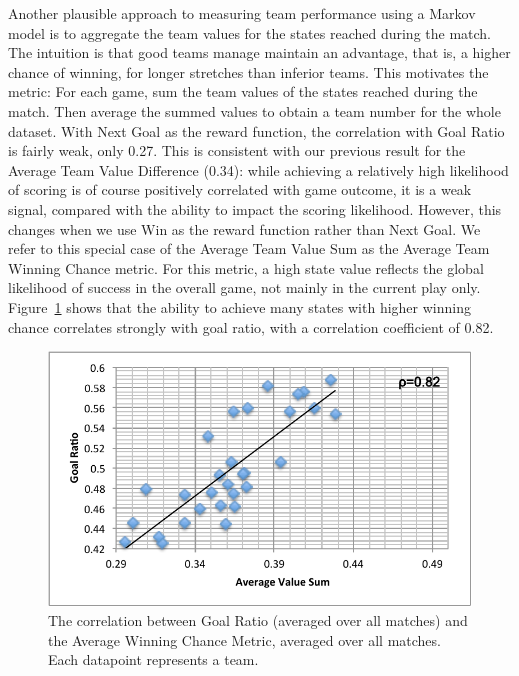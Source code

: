 Another plausible approach to measuring team performance using a Markov model is to aggregate the team values for the states reached during the match. The intuition is that good teams manage maintain an advantage, that is, a higher chance of winning, for longer stretches than inferior teams. This motivates the  metric: For each game, sum the team values of the states reached during the match. Then average the summed values to obtain a team number for the whole dataset. With Next Goal as the reward function, the correlation with Goal Ratio is fairly weak, only 0.27. This is consistent with our previous result for the Average Team Value Difference (0.34): while achieving a relatively high likelihood of scoring is of course positively correlated with game outcome, it is a weak signal, compared with the ability to impact the scoring likelihood. However, this  changes when we use Win as the reward function rather than Next Goal. We refer to this special case of the Average Team Value Sum as the Average Team Winning Chance metric. For this metric, a high state value reflects the global likelihood of success in the overall game, not mainly in the current play only. Figure~\ref{fig:win-value-sum} shows that the ability to achieve many states with higher winning chance correlates strongly with goal ratio, with a correlation coefficient of 0.82.

\begin{figure}
\centering 
\includegraphics[width=1\textwidth]{value-sum-win}
\caption{The correlation between Goal Ratio (averaged over all matches) and the Average Winning Chance Metric, averaged over all matches. Each datapoint represents a team.}
\label{fig:win-value-sum}
\end{figure}



